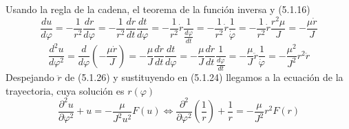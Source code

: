 Usando la regla de la cadena, el teorema de la función inversa y (5.1.16)
\begin{equation} \label{5.1.25}
    \frac{d u}{d\varphi}  = -\frac{1}{r^2} \frac{dr}{d\varphi} = -\frac{1}{r^2} \frac{dr}{dt} \frac{dt}{d\varphi}= -\frac{1}{r^2} \dot{r} \frac{1}{\frac{d\varphi}{dt}}=-\frac{1}{r^2} \dot{r} \frac{1}{\dot{\varphi}}= -\frac{1}{r^2} \dot{r} \frac{r^2 \mu}{J} = -\frac{\mu \dot{r}}{J}
\end{equation} 
\begin{equation} \label{5.1.26}
    \frac{d^2 u}{d\varphi^2}  = \frac{d}{d\varphi}\left(-\frac{\mu \dot{r}}{J}\right)=-\frac{\mu}{J} \frac{d \dot{r}}{dt} \frac{dt}{d\varphi} = -\frac{\mu}{J} \frac{d \dot{r}}{dt} \frac{1}{\frac{d\varphi}{dt}} = -\frac{\mu}{J} \ddot{r} \frac{1}{\dot{\varphi}}= - \frac{\mu^2}{J^2} r^2 \ddot{r}
\end{equation} 
Despejando $\ddot{r}$ de (5.1.26) y sustituyendo en (5.1.24) llegamos a la ecuación de la trayectoria, cuya solución es $r(\varphi)$
\begin{equation} \label{5.1.27}
    \frac{\partial^2 u}{\partial \varphi^2} + u = -\frac{\mu}{J^2 u^2}F(u) \iff \frac{\partial^2}{\partial \varphi^2}\left(\frac{1}{r}\right) + \frac{1}{r} = -\frac{\mu}{J^2}r^2F(r)
\end{equation} 